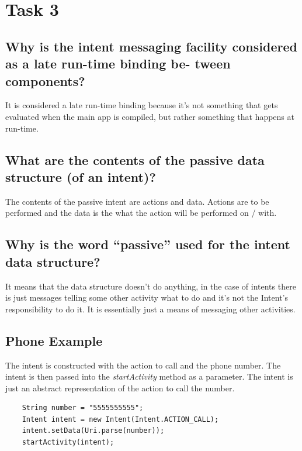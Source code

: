 \documentclass[11pt,english,numbers=endperiod,parskip=half]{scrartcl}
\begin{document}
\section{Task 3}
\subsection{Why is the intent messaging facility considered as a late run-time binding be- tween components?}
It is considered a late run-time binding because it's not something that gets evaluated when the main app is compiled, but rather something that happens at run-time.

\subsection{What are the contents of the passive data structure (of an intent)?}
The contents of the passive intent are actions and data. Actions are to be performed and the data is the what the action will be performed on / with.

\subsection{Why is the word “passive” used for the intent data structure?}
It means that the data structure doesn't do anything, in the case of intents there is just messages telling some other activity what to do and it's not the Intent's responsibility to do it. It is essentially just a means of messaging other activities.

\subsection{Phone Example}
The intent is constructed with the action to call and the phone number. The intent is then passed into the \textit{startActivity} method as a parameter. The intent is just an abstract representation of the action to call the number.
\begin{verbatim}
	String number = "5555555555";
	Intent intent = new Intent(Intent.ACTION_CALL);
	intent.setData(Uri.parse(number));
	startActivity(intent);
\end{verbatim}
\end{document}
